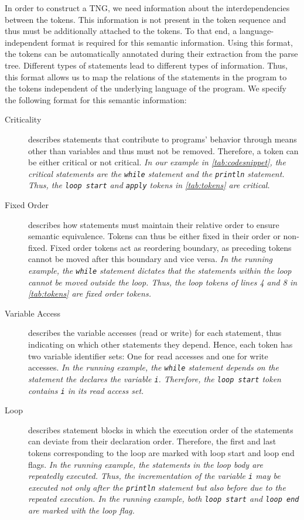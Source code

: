 \label{subsec:semantic}
In order to construct a TNG, we need information about the interdependencies between the tokens.
This information is not present in the token sequence and thus must be additionally attached to the tokens.
To that end, a language-independent format is required for this semantic information.
Using this format, the tokens can be automatically annotated during their extraction from the parse tree. Different types of statements lead to different types of information.
Thus, this format allows us to map the relations of the statements in the program to the tokens independent of the underlying language of the program.
%
We specify the following format for this semantic information:
\begin{description}
    \item[Criticality] describes statements that contribute to programs' behavior through means other than variables and thus must not be removed. Therefore, a token can be either critical or not critical.
        \textit{In our example in \autoref{tab:codesnippet}, the critical statements are the \texttt{while} statement and the \texttt{println} statement. Thus, the \texttt{loop start} and \texttt{apply} tokens in \autoref{tab:tokens} are critical.}
    \item[Fixed Order] describes how statements must maintain their relative order to ensure semantic equivalence. Tokens can thus be either fixed in their order or non-fixed. Fixed order tokens act as reordering boundary, as preceding tokens cannot be moved after this boundary and vice versa.
        \textit{In the running example, the \texttt{while} statement dictates that the statements within the loop cannot be moved outside the loop. Thus, the loop tokens of lines 4 and 8 in \autoref{tab:tokens} are fixed order tokens.}
    \item[Variable Access] describes the variable accesses (read or write) for each statement, thus indicating on which other statements they depend.
        Hence, each token has two variable identifier sets: One for read accesses and one for write accesses.
        \textit{In the running example, the \texttt{while} statement depends on the statement the declares the variable \texttt{i}. Therefore, the \texttt{loop start} token contains \texttt{i} in its read access set.}
    \item[Loop] describes statement blocks in which the execution order of the statements can deviate from their declaration order. Therefore, the first and last tokens corresponding to the loop are marked with loop start and loop end flags.
        \textit{In the running example, the statements in the loop body are repeatedly executed. Thus, the incrementation of the variable \texttt{i} may be executed not only after the \texttt{println} statement but also before due to the repeated execution. In the running example, both \texttt{loop start} and \texttt{loop end} are marked with the loop flag.}
\end{description}


